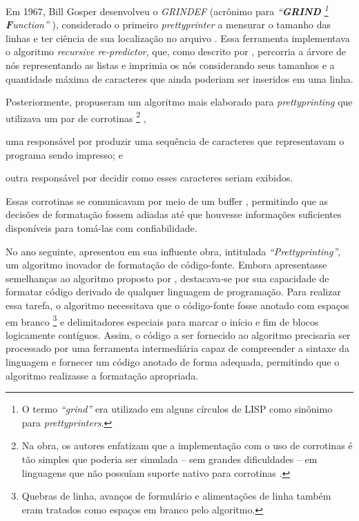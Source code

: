 \documentclass
  [11pt,a4paper,english,brazil,openright,sumario=tradicional,twoside]
  {abntex2}
\begin{document}
  Em 1967, Bill Gosper desenvolveu o \textit{GRINDEF} (acrônimo para
  \textit
    {%
      ``\textbf{GRIND}%
      \footnote
        { O termo \textit{``grind''} era utilizado em alguns círculos de LISP
          como sinônimo para \textit{prettyprinters}.}
      \textbf{F}unction''}%
  ), considerado o primeiro \textit{prettyprinter} a mensurar o tamanho das
  linhas e ter ciência de sua localização no arquivo
  \cites{gosper-2023-twubblesome}{griesemer-2022-cultural}. Essa ferramenta
  implementava o algoritmo \textit{recursive re-predictor}, que, como descrito
  por \textcite{goldstein-1973-pretty}, percorria a árvore de nós representando
  as listas e imprimia os nós considerando seus tamanhos e a quantidade máxima
  de caracteres que ainda poderiam ser inseridos em uma linha.

  Posteriormente, \textcite{hearn-1979-one} propuseram um algoritmo mais
  elaborado para \textit{prettyprinting} que utilizava um par de corrotinas%
  \footnote
    { Na obra, os autores enfatizam que a implementação com o uso de corrotinas
      é tão simples que poderia ser simulada -- sem grandes dificuldades -- em
      linguagens que não possuíam suporte nativo para corrotinas
      \cite[53]{hearn-1979-one}.}%
  ,
  \begin{inparaenum}
    \item uma responsável por produzir uma sequência de caracteres que
          representavam o programa sendo impresso; e
    \item outra responsável por decidir como esses caracteres seriam exibidos.
  \end{inparaenum}
  Essas corrotinas se comunicavam por meio de um buffer ,
  permitindo que as decisões de formatação fossem adiadas até que houvesse
  informações suficientes disponíveis para tomá-las com confiabilidade.

  No ano seguinte, \textcite{oppen-1980-prettyprinting} apresentou em sua
  influente obra, intitulada \textit{``Prettyprinting''}, um algoritmo inovador
  de formatação de código-fonte. Embora apresentasse semelhanças ao algoritmo
  proposto por \textcite{hearn-1979-one}, destacava-se por sua capacidade de
  formatar código derivado de qualquer linguagem de programação. Para realizar
  essa tarefa, o algoritmo necessitava que o código-fonte fosse anotado com
  espaços em branco%
  \footnote
    { Quebras de linha, avanços de formulário e alimentações de linha também
      eram tratados como espaços em branco pelo algoritmo.}
  e delimitadores especiais para marcar o início e fim de blocos logicamente
  contíguos. Assim, o código a ser fornecido ao algoritmo precisaria ser
  processado por uma ferramenta intermediária capaz de compreender a sintaxe da
  linguagem e fornecer um código anotado de forma adequada, permitindo que o
  algoritmo realizasse a formatação apropriada.
\end{document}
